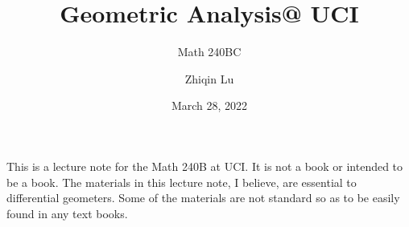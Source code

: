 \documentclass[lang=en,11pt,green,fancy]{elegantbook}
\title{Geometric Analysis@ UCI}
\subtitle{Math 240BC}
\author{Zhiqin Lu}
\institute{University of California, Irvine}
\date{March 28, 2022}
\newcommand{\<}{\langle}
\renewcommand{\>}{\rangle}
\numberwithin{equation}{chapter}
\begin{document}
\maketitle
\frontmatter
\tableofcontents
\mainmatter

\newpage




















\nocite{*}

\printbibliography


\newpage


\begin{remark}
This is a lecture note for the Math 240B at UCI. It is not a book or intended to be a book. The materials in this lecture note, I believe, are essential to differential geometers. Some of the materials are not standard so as to be easily found in  any text books.
\end{remark}

\vspace{2in}
\end{document}
